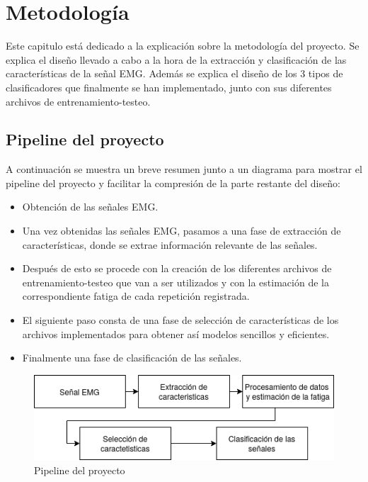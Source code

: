 \chapter{Metodología} \label{cap6}
Este capitulo está dedicado a la explicación sobre la metodología del proyecto. Se explica el diseño llevado a cabo a la hora de la extracción y clasificación de las características de la señal EMG. Además se explica el diseño de los 3 tipos de clasificadores que finalmente se han implementado, junto con sus diferentes archivos de entrenamiento-testeo. 

\section{Pipeline del proyecto}
A continuación se muestra un breve resumen junto a un diagrama para mostrar el pipeline del proyecto y facilitar la compresión de la  parte restante del diseño:

\begin{itemize}
\item Obtención de las señales EMG.
\item Una vez obtenidas las señales EMG, pasamos a una fase de extracción de características, donde se extrae información relevante de las señales. 
\item Después de esto se procede con la creación de los diferentes archivos de entrenamiento-testeo que van a ser utilizados y con la estimación de la correspondiente fatiga de cada repetición registrada.
\item El siguiente paso consta de una fase de selección de características de los archivos implementados para obtener así modelos sencillos y eficientes.
\item Finalmente una fase de clasificación de las señales.
\end{itemize}


\begin{figure}[ht]
    \centering
    \includegraphics[scale=0.7]{imagenes/diagrma simple.png}
    \caption{ Pipeline del proyecto }
    \label{fig:esuqmemaarchivo}
    \end{figure}
 
